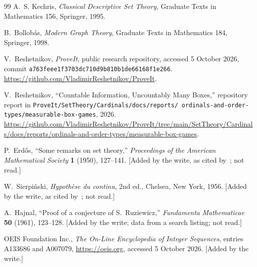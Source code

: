 \documentclass[11pt]{article}
\theoremstyle{definition}
\theoremstyle{remark}
\begin{document}
\begin{thebibliography}{99}
A.~S. Kechris,
\emph{Classical Descriptive Set Theory},
Graduate Texts in Mathematics 156, Springer, 1995.

B.~Bollob\'as,
\emph{Modern Graph Theory},
Graduate Texts in Mathematics 184, Springer, 1998.

V.~Reshetnikov,
\emph{ProveIt}, public research repository, accessed 5 October 2026,
commit \texttt{a763feee1f3703dc710d9b810b1de66168f1e266}.
\url{https://github.com/VladimirReshetnikov/ProveIt}.

V.~Reshetnikov,
``Countable Information, Uncountably Many Boxes,''
repository report in \texttt{ProveIt/SetTheory/Cardinals/docs/reports/
ordinals-and-order-types/measurable-box-games}, 2026.
\url{https://github.com/VladimirReshetnikov/ProveIt/tree/main/SetTheory/Cardinals/docs/reports/ordinals-and-order-types/measurable-box-games}.

P.~Erd\H{o}s,
``Some remarks on set theory,''
\emph{Proceedings of the American Mathematical Society} \textbf{1} (1950),
127--141. [Added by the write, as cited by~\cite{deBruijnErdos}; not read.]

W.~Sierpi\'nski,
\emph{Hypoth\`ese du continu}, 2nd ed., Chelsea, New York, 1956.
[Added by the write, as cited by~\cite{Freiling}; not read.]

A.~Hajnal,
``Proof of a conjecture of S.~Ruziewicz,''
\emph{Fundamenta Mathematicae} \textbf{50} (1961), 123--128.
[Added by the write; data from a search listing; not read.]

OEIS Foundation Inc.,
\emph{The On-Line Encyclopedia of Integer Sequences}, entries A133686 and
A007079, \url{https://oeis.org}, accessed 5 October 2026. [Added by the
write.]

\end{thebibliography}
\end{document}

